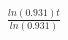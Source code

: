\documentclass[preview]{standalone}
\begin{document}
\begin{align*}
\frac{ln(0.931)t}{ln(0.931)}
\end{align*}
\end{document}
